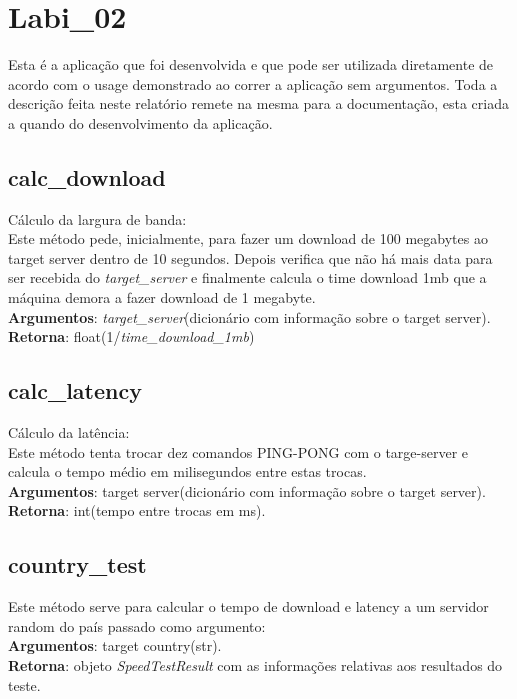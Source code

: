 \documentclass{report}
\begin{document}
\section{Labi\_02}
\hspace{5mm}Esta é a aplicação que foi desenvolvida e que pode ser utilizada diretamente de acordo com o usage demonstrado ao correr a aplicação sem argumentos. Toda a descrição feita neste relatório remete na mesma para a documentação, esta criada a quando do desenvolvimento da aplicação.

\subsection{calc\_download}
\hspace{5mm}Cálculo da largura de banda:\\
Este método pede, inicialmente, para fazer um download de 100 megabytes ao target server dentro de 10 segundos. Depois verifica que não há mais data para ser recebida do \textit{target\_server} e finalmente calcula o time download 1mb que a máquina demora a fazer download de 1 megabyte.\\ 
\hspace{5mm}\textbf{Argumentos}: \textit{target\_server}(dicionário com informação sobre o target server). 
\hspace{5mm}\textbf{Retorna}: float(1/\textit{time\_download\_1mb})

\subsection{calc\_latency}
\hspace{5mm}Cálculo da latência:\\ 
Este método tenta trocar dez comandos PING-PONG com o targe-server e calcula o tempo médio em milisegundos entre estas trocas.\\
\hspace{5mm}\textbf{Argumentos}: target server(dicionário com informação sobre o target server). 
\hspace{5mm}\textbf{Retorna}: int(tempo entre trocas em ms).

\subsection{country\_test}
\hspace{5mm}Este método serve para calcular o tempo de download e latency a um servidor random do país passado como argumento:\\ 
\hspace{5mm}\textbf{Argumentos}: target country(str).\\
\hspace{5mm}\textbf{Retorna}: objeto \textit{SpeedTestResult} com as informações relativas aos resultados do teste.
\end{document}
